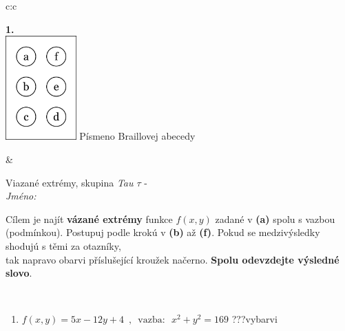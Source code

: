 \documentclass[10pt]{report}
\begin{document}
\begin{tabular}{c:c}
\begin{minipage}[c][104.5mm][t]{0.5\linewidth}
\begin{center}
\begin{minipage}{0.79\linewidth}
\begin{center}
\begin{varwidth}{\linewidth}
\begin{enumerate}
\end{enumerate}
\end{varwidth}
\end{center}
\end{minipage}
\begin{minipage}{0.20\linewidth}
\begin{center}
{\Huge\bfseries 1.} \\[2mm]
\includegraphics[height=40mm]{../images/braille.png}
{\small Písmeno Braillovej abecedy}
\end{center}
\end{minipage}
\end{center}
\end{minipage}
&
\begin{minipage}[c][104.5mm][t]{0.5\linewidth}
\begin{center}
\vspace{7mm}
{\huge Viazané extrémy, skupina \textit{Tau $\tau$} -}\\[5mm]
\textit{Jméno:}\phantom{xxxxxxxxxxxxxxxxxxxxxxxxxxxxxxxxxxxxxxxxxxxxxxxxxxxxxxxxxxxxxxxxx}\\[5mm]
\begin{minipage}{0.95\linewidth}
\begin{center}
Cílem je najít \textbf{vázané extrémy} funkce $f(x,y)$ zadané v \textbf{(a)} spolu s vazbou (podmínkou). Postupuj podle krokú v \textbf{(b)} až \textbf{(f)}. Pokud se medzivýsledky shodujú s těmi za otazníky,\\tak napravo obarvi příslušející kroužek načerno. \textbf{Spolu odevzdejte výsledné slovo}.
\end{center}
\end{minipage}
\\[1mm]
\begin{minipage}{0.79\linewidth}
\begin{center}
\begin{varwidth}{\linewidth}
\begin{enumerate}
\normalsize
\item $f(x,y)=5x-12y+4 \enspace , \enspace \mathrm{vazba:} \enspace x^2+y^2=169$\quad \dotfill\; ???\;\dotfill \quad vybarvi

\end{enumerate}
\end{varwidth}
\end{center}
\end{minipage}
\end{center}
\end{minipage}
\end{tabular}
\end{document}
